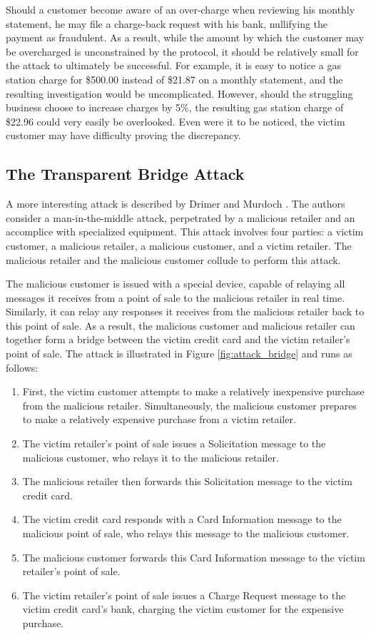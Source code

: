 Should a customer become aware of an over-charge when reviewing his monthly statement, he may file a charge-back request with his bank, nullifying the payment as fraudulent.
As a result, while the amount by which the customer may be overcharged is unconstrained by the protocol, it should be relatively small for the attack to ultimately be successful.
For example, it is easy to notice a gas station charge for \$500.00 instead of \$21.87 on a monthly statement, and the resulting investigation would be uncomplicated.
However, should the struggling business choose to increase charges by 5\%, the resulting gas station charge of \$22.96 could very easily be overlooked.
Even were it to be noticed, the victim customer may have difficulty proving the discrepancy.


\subsection{The Transparent Bridge Attack}

A more interesting attack is described by Drimer and Murdoch \cite{Drimer:2007:KYE:1362903.1362910}.
The authors consider a man-in-the-middle attack, perpetrated by a malicious retailer and an accomplice with specialized equipment.
This attack involves four parties: a victim customer, a malicious retailer, a malicious customer, and a victim retailer.
The malicious retailer and the malicious customer collude to perform this attack.

The malicious customer is issued with a special device, capable of relaying all messages it receives from a point of sale to the malicious retailer in real time.
Similarly, it can relay any responses it receives from the malicious retailer back to this point of sale.
As a result, the malicious customer and malicious retailer can together form a bridge between the victim credit card and the victim retailer's point of sale.
The attack is illustrated in Figure \ref{fig:attack_bridge} and runs as follows:

\begin{enumerate}
\item First, the victim customer attempts to make a relatively inexpensive purchase from the malicious retailer.
Simultaneously, the malicious customer prepares to make a relatively expensive purchase from a victim retailer.
\item The victim retailer's point of sale issues a Solicitation message to the malicious customer, who relays it to the malicious retailer.
\item The malicious retailer then forwards this Solicitation message to the victim credit card.
\item The victim credit card responds with a Card Information message to the malicious point of sale, who relays this message to the malicious customer.
\item The malicious customer forwards this Card Information message to the victim retailer's point of sale.
\item The victim retailer's point of sale issues a Charge Request message to the victim credit card's bank, charging the victim customer for the expensive purchase.
\end{enumerate}


